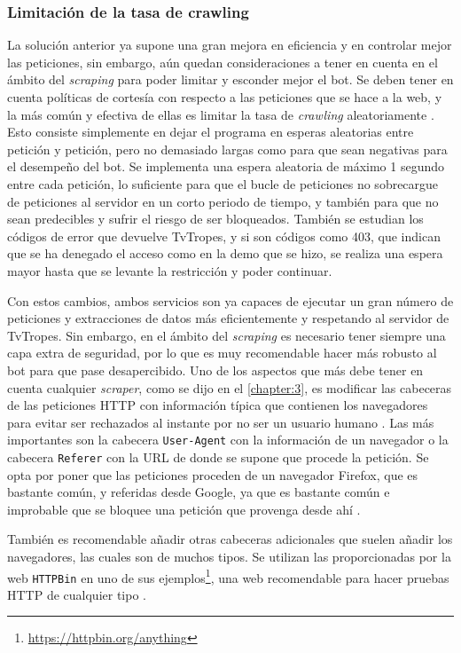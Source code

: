 \subsubsection{Limitación de la tasa de crawling}
La solución anterior ya supone una gran mejora en eficiencia y en controlar
mejor las peticiones, sin embargo, aún quedan consideraciones a tener en cuenta
en el ámbito del \textit{scraping} para poder limitar y esconder mejor el bot.
Se deben tener en cuenta políticas de cortesía con respecto a las peticiones que
se hace a la web, y la más común y efectiva de ellas es limitar la tasa de
\textit{crawling} aleatoriamente \cite{apress2018scraping}. Esto consiste
simplemente en dejar el programa en esperas aleatorias entre petición y
petición, pero no demasiado largas como para que sean negativas para el
desempeño del bot. Se implementa una espera aleatoria de máximo 1 segundo entre
cada petición, lo suficiente para que el bucle de peticiones no sobrecargue de
peticiones al servidor en un corto periodo de tiempo, y también para que no sean
predecibles y sufrir el riesgo de ser bloqueados. También se estudian
los códigos de error que devuelve TvTropes, y si son códigos como 403, que
indican que se ha denegado el acceso como en la demo que se hizo, se realiza una
espera mayor hasta que se levante la restricción y poder continuar.

Con estos cambios, ambos servicios son ya capaces de ejecutar un gran número de
peticiones y extracciones de datos más eficientemente y respetando al
servidor de TvTropes. Sin embargo, en el ámbito del \textit{scraping} es
necesario tener siempre una capa extra de seguridad, por lo que es muy
recomendable hacer más robusto al bot para que pase desapercibido. Uno de
los aspectos que más debe tener en cuenta cualquier \textit{scraper}, como se
dijo en el \autoref{chapter:3}, es modificar las cabeceras de las peticiones
HTTP con información típica que contienen los navegadores para evitar ser
rechazados al instante por no ser un usuario humano \cite{apress2018scraping}.
Las más importantes son la cabecera \texttt{User-Agent} con la información de un
navegador o la cabecera \texttt{Referer} con la URL de donde se supone que
procede la petición. Se opta por poner que las peticiones proceden de un
navegador Firefox, que es bastante común, y referidas desde Google, ya que es
bastante común e improbable que se bloquee una petición que provenga desde ahí
\cite{bettenbuk_10_2019}.

También es recomendable añadir otras cabeceras adicionales que suelen añadir los
navegadores, las cuales son de muchos tipos. Se utilizan las proporcionadas por
la web \texttt{HTTPBin} en uno de sus
ejemplos\footnote{\url{https://httpbin.org/anything}}, una web recomendable para
hacer pruebas HTTP de cualquier tipo \cite{bettenbuk_10_2019}.

